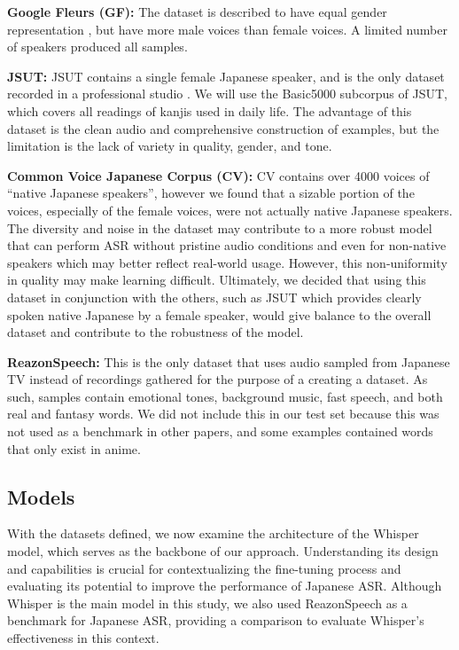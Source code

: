 \documentclass[10pt,twocolumn,letterpaper]{article}
\begin{document}
\textbf{Google Fleurs (GF):}
The dataset is described to have equal gender representation \cite{conneauFLEURSFewshotLearning2022}, but have more male voices than female voices. A limited number of speakers produced all samples.

\textbf{JSUT:}
JSUT contains a single female Japanese speaker, and is the only dataset recorded in a professional studio \cite{sonobeJSUTCorpusFree2017}. We will use the Basic5000 subcorpus of JSUT, which covers all readings of kanjis used in daily life. The advantage of this dataset is the clean audio and comprehensive construction of examples, but the limitation is the lack of variety in quality, gender, and tone. 

\textbf{Common Voice Japanese Corpus (CV):}
CV contains over 4000 voices of “native Japanese speakers”\cite{ardilaCommonVoiceMassivelyMultilingual2020}, however we found that a sizable portion of the voices, especially of the female voices, were not actually native Japanese speakers. The diversity and noise in the dataset may contribute to a more robust model that can perform ASR without pristine audio conditions and even for non-native speakers which may better reflect real-world usage. However, this non-uniformity in quality may make learning difficult. Ultimately, we decided that using this dataset in conjunction with the others, such as JSUT which provides clearly spoken native Japanese by a female speaker, would give balance to the overall dataset and contribute to the robustness of the model.

\textbf{ReazonSpeech:}
This is the only dataset that uses audio sampled from Japanese TV \cite{yinReazonSpeechFreeMassive} instead of recordings gathered for the purpose of a creating a dataset. As such, samples contain emotional tones, background music, fast speech, and both real and fantasy words. We did not include this in our test set because this was not used as a benchmark in other papers, and some examples contained words that only exist in anime.

\subsection{Models}

With the datasets defined, we now examine the architecture of the Whisper model, which serves as the backbone of our approach. Understanding its design and capabilities is crucial for contextualizing the fine-tuning process and evaluating its potential to improve the performance of Japanese ASR. Although Whisper is the main model in this study, we also used ReazonSpeech as a benchmark for Japanese ASR, providing a comparison to evaluate Whisper’s effectiveness in this context.
\end{document}
